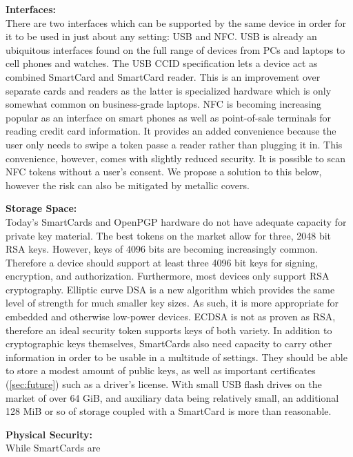 \documentclass[11pt, twocolumn]{article}
\newenvironment{packed_desc}{
\begin{description}
  \setlength{\itemsep}{1pt}
  \setlength{\parskip}{0pt}
  \setlength{\parsep}{0pt}
}{\end{description}}
\begin{document}
\begin{packed_desc}
\item{\textbf{Interfaces:}} \\ \hfill There are two interfaces which
  can be supported by the same device in order for it to be used in
  just about any setting: USB and NFC. USB is already an ubiquitous
  interfaces found on the full range of devices from PCs and laptops
  to cell phones and watches. The USB CCID specification lets a device
  act as combined SmartCard and SmartCard reader. This is an
  improvement over separate cards and readers as the latter is
  specialized hardware which is only somewhat common on business-grade
  laptops. NFC is becoming increasing popular as an interface on smart
  phones as well as point-of-sale terminals for reading credit card
  information. It provides an added convenience because the user only
  needs to swipe a token passe a reader rather than plugging it
  in. This convenience, however, comes with slightly reduced
  security. It is possible to scan NFC tokens without a user's
  consent. We propose a solution to this below, however the risk can
  also be mitigated by metallic covers.
\item{\textbf{Storage Space:}} \\ \hfill Today's SmartCards and
  OpenPGP hardware do not have adequate capacity for private key
  material. The best tokens on the market allow for three, 2048 bit
  RSA keys. However, keys of 4096 bits are becoming increasingly
  common. Therefore a device should support at least three 4096 bit
  keys for signing, encryption, and authorization. Furthermore, most
  devices only support RSA cryptography. Elliptic curve DSA is a new
  algorithm which provides the same level of strength for much smaller
  key sizes. As such, it is more appropriate for embedded and
  otherwise low-power devices. ECDSA is not as proven as RSA,
  therefore an ideal security token supports keys of both variety. In
  addition to cryptographic keys themselves, SmartCards also need
  capacity to carry other information in order to be usable in a
  multitude of settings. They should be able to store a modest amount
  of public keys, as well as important certificates
  (\autoref{sec:future}) such as a driver's license. With small USB
  flash drives on the market of over 64 GiB, and auxiliary data being
  relatively small, an additional 128 MiB or so of storage coupled
  with a SmartCard is more than reasonable.
\item{\textbf{Physical Security:}} \\ \hfill While SmartCards are

\end{packed_desc}
\end{document}
